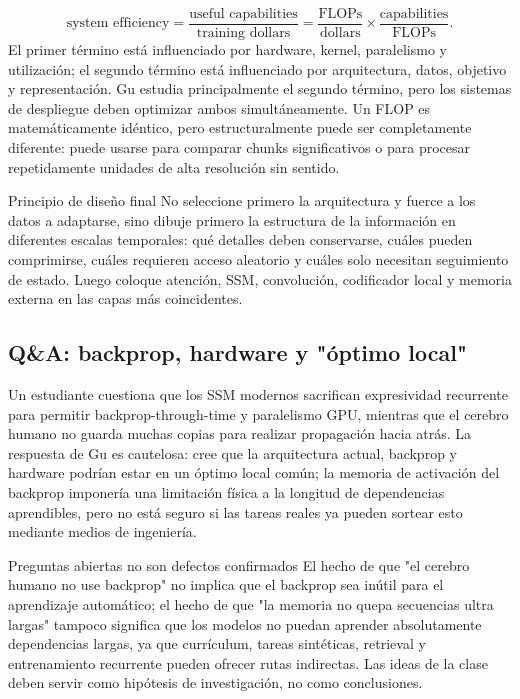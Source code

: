 \[
\text{system efficiency}
=\frac{\text{useful capabilities}}{\text{training dollars}}
=\frac{\text{FLOPs}}{\text{dollars}}
\times
\frac{\text{capabilities}}{\text{FLOPs}}.
\]
El primer término está influenciado por hardware, kernel, paralelismo y utilización; el segundo término está influenciado por arquitectura, datos, objetivo y representación. Gu estudia principalmente el segundo término, pero los sistemas de despliegue deben optimizar ambos simultáneamente. Un FLOP es matemáticamente idéntico, pero estructuralmente puede ser completamente diferente: puede usarse para comparar chunks significativos o para procesar repetidamente unidades de alta resolución sin sentido.

\begin{importantbox}{Principio de diseño final}
No seleccione primero la arquitectura y fuerce a los datos a adaptarse, sino dibuje primero la estructura de la información en diferentes escalas temporales: qué detalles deben conservarse, cuáles pueden comprimirse, cuáles requieren acceso aleatorio y cuáles solo necesitan seguimiento de estado. Luego coloque atención, SSM, convolución, codificador local y memoria externa en las capas más coincidentes.
\end{importantbox}

\subsection{Q\&A: backprop, hardware y "óptimo local"}

Un estudiante cuestiona que los SSM modernos sacrifican expresividad recurrente para permitir backprop-through-time y paralelismo GPU, mientras que el cerebro humano no guarda muchas copias para realizar propagación hacia atrás. La respuesta de Gu es cautelosa: cree que la arquitectura actual, backprop y hardware podrían estar en un óptimo local común; la memoria de activación del backprop imponería una limitación física a la longitud de dependencias aprendibles, pero no está seguro si las tareas reales ya pueden sortear esto mediante medios de ingeniería.


\begin{warningbox}{Preguntas abiertas no son defectos confirmados}
El hecho de que "el cerebro humano no use backprop" no implica que el backprop sea inútil para el aprendizaje automático; el hecho de que "la memoria no quepa secuencias ultra largas" tampoco significa que los modelos no puedan aprender absolutamente dependencias largas, ya que currículum, tareas sintéticas, retrieval y entrenamiento recurrente pueden ofrecer rutas indirectas. Las ideas de la clase deben servir como hipótesis de investigación, no como conclusiones.
\end{warningbox}

